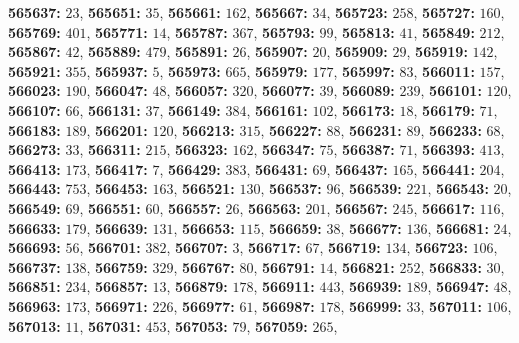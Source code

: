 \textsf{\bfseries 565637:} $23$, \textsf{\bfseries 565651:} $35$, \textsf{\bfseries 565661:} $162$, \textsf{\bfseries 565667:} $34$, \textsf{\bfseries 565723:} $258$, \textsf{\bfseries 565727:} $160$, \textsf{\bfseries 565769:} $401$, \textsf{\bfseries 565771:} $14$, \textsf{\bfseries 565787:} $367$, \textsf{\bfseries 565793:} $99$, \textsf{\bfseries 565813:} $41$, \textsf{\bfseries 565849:} $212$, \textsf{\bfseries 565867:} $42$, \textsf{\bfseries 565889:} $479$, \textsf{\bfseries 565891:} $26$, \textsf{\bfseries 565907:} $20$, \textsf{\bfseries 565909:} $29$, \textsf{\bfseries 565919:} $142$, \textsf{\bfseries 565921:} $355$, \textsf{\bfseries 565937:} $5$, \textsf{\bfseries 565973:} $665$, \textsf{\bfseries 565979:} $177$, \textsf{\bfseries 565997:} $83$, \textsf{\bfseries 566011:} $157$, \textsf{\bfseries 566023:} $190$, \textsf{\bfseries 566047:} $48$, \textsf{\bfseries 566057:} $320$, \textsf{\bfseries 566077:} $39$, \textsf{\bfseries 566089:} $239$, \textsf{\bfseries 566101:} $120$, \textsf{\bfseries 566107:} $66$, \textsf{\bfseries 566131:} $37$, \textsf{\bfseries 566149:} $384$, \textsf{\bfseries 566161:} $102$, \textsf{\bfseries 566173:} $18$, \textsf{\bfseries 566179:} $71$, \textsf{\bfseries 566183:} $189$, \textsf{\bfseries 566201:} $120$, \textsf{\bfseries 566213:} $315$, \textsf{\bfseries 566227:} $88$, \textsf{\bfseries 566231:} $89$, \textsf{\bfseries 566233:} $68$, \textsf{\bfseries 566273:} $33$, \textsf{\bfseries 566311:} $215$, \textsf{\bfseries 566323:} $162$, \textsf{\bfseries 566347:} $75$, \textsf{\bfseries 566387:} $71$, \textsf{\bfseries 566393:} $413$, \textsf{\bfseries 566413:} $173$, \textsf{\bfseries 566417:} $7$, \textsf{\bfseries 566429:} $383$, \textsf{\bfseries 566431:} $69$, \textsf{\bfseries 566437:} $165$, \textsf{\bfseries 566441:} $204$, \textsf{\bfseries 566443:} $753$, \textsf{\bfseries 566453:} $163$, \textsf{\bfseries 566521:} $130$, \textsf{\bfseries 566537:} $96$, \textsf{\bfseries 566539:} $221$, \textsf{\bfseries 566543:} $20$, \textsf{\bfseries 566549:} $69$, \textsf{\bfseries 566551:} $60$, \textsf{\bfseries 566557:} $26$, \textsf{\bfseries 566563:} $201$, \textsf{\bfseries 566567:} $245$, \textsf{\bfseries 566617:} $116$, \textsf{\bfseries 566633:} $179$, \textsf{\bfseries 566639:} $131$, \textsf{\bfseries 566653:} $115$, \textsf{\bfseries 566659:} $38$, \textsf{\bfseries 566677:} $136$, \textsf{\bfseries 566681:} $24$, \textsf{\bfseries 566693:} $56$, \textsf{\bfseries 566701:} $382$, \textsf{\bfseries 566707:} $3$, \textsf{\bfseries 566717:} $67$, \textsf{\bfseries 566719:} $134$, \textsf{\bfseries 566723:} $106$, \textsf{\bfseries 566737:} $138$, \textsf{\bfseries 566759:} $329$, \textsf{\bfseries 566767:} $80$, \textsf{\bfseries 566791:} $14$, \textsf{\bfseries 566821:} $252$, \textsf{\bfseries 566833:} $30$, \textsf{\bfseries 566851:} $234$, \textsf{\bfseries 566857:} $13$, \textsf{\bfseries 566879:} $178$, \textsf{\bfseries 566911:} $443$, \textsf{\bfseries 566939:} $189$, \textsf{\bfseries 566947:} $48$, \textsf{\bfseries 566963:} $173$, \textsf{\bfseries 566971:} $226$, \textsf{\bfseries 566977:} $61$, \textsf{\bfseries 566987:} $178$, \textsf{\bfseries 566999:} $33$, \textsf{\bfseries 567011:} $106$, \textsf{\bfseries 567013:} $11$, \textsf{\bfseries 567031:} $453$, \textsf{\bfseries 567053:} $79$, \textsf{\bfseries 567059:} $265$, 
